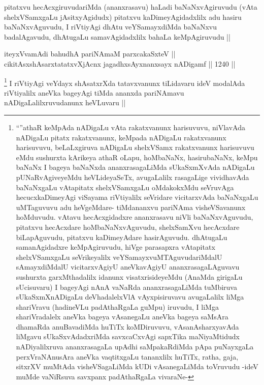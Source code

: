 \begin{artha}
pitatxvu hecAcxgiruvudariMda (ananxrasavu) haLadi baNaNxvAgiruvudu (vAta shelxVSamxgaLu jAsitxyAgidudx) pitatxvu kaDimeyAgidadxlilx adu hasiru baNaNxvAguvudu, I riVtiyAgi dhAtu veYSamayxdiMda baNaNxvu badalAgavudu, dhAtugaLu samavAgidadxlilx bahaLa keMpAgiruvudu ||
\end{artha}

\begin{shl}
iteyxVvamAdi bahudhA pariNAmaM parxcakaSxteV || \\
cikitAsxshAsarxtatatxvXjAcnx jagadhxsAyxnanxsayx nADigamf ||  1240 ||  
\end{shl}

\begin{artha}
\footnote{``\stext''athaR keMpAda nADigaLu vAta rakatxvanunx harisuvuvu, niVlavAda nADigaLu pitatx rakatxvanunx, keMpada nADigaLu rakatxvanunx harisuvuvu, beLaLxgiruva nADigaLu shelxVSamx rakatxvanunx harisuvuvu eMdu sushurxta kArikeya athaR oLapu, hoMbaNaNx, hasirubaNaNx, keMpu baNaNx I bageya baNaNxda ananxrasagaLiMda sUkaSxmXvAda nADigaLu pUNaRvAgiveyeMdu heVLideyaSeTx, avugaLalilx rasagaLige vividhavAda baNaNxgaLu vAtapitatx shelxVSamxgaLu oMdakokxMdu seVruvAga hecucxkaDimeyAgi viSayama riVtiyalilx seVridare vicitarxvAda baNaNxgaLu uMTaguvuvu adu heVgeMdare- tiMdananxvu pariNAma visheVSavanunx hoMduvudu. vAtavu hecAcxgidadxre ananxrasavu niVli baNaNxvAguvudu, pitatxvu hecAcxdare hoMbaNaNxvAguvudu, shelxSamXvu hecAcxdare biLapAguvudu, pitatxvu kaDimeyAdare hasirAguvudu. dhAtugaLu samanAgidadxre keMpAgiruvudu, hiVge parasapxra vAtapitatx shelxVSamxgaLu seVrikeyalilx veYSamayxvuMTAguvudariMdalU sAmayxdiMdalU vicitarxvAgiyU aneVkavAgiyU ananxrasagaLAguvavu sushurxta garxMthadalilx idanunx visatxrisideyeMdu (AnaMda girigaLu sUcisuvaru) I bageyAgi nAnA vaNaRda ananxrasagaLiMda tuMbiruva sUkaSxmXnADigaLu deVhadalelxVlA vAyxpisiruvavu avugaLalilx liMga shariVravu (hadineVLu padAthaRgaLa guMpu) iruvudu, I liMga shariVradalelx aneVka bageya vAsanegaLu aneVka bageya saMsAra dhamaRda anuBavadiMda huTiTx koMDiruvuvu, vAsanAsharxyavAda liMgavu sUkaSxvAdadxriMda savxcaCxvAgi sapxTika maNiyaMtidudx nADiyalilxruva ananxrasagaLa upAdhi saMpakaRdiMda pApa puNayxgaLa perxVraNAnusAra aneVka vaqtitxgaLu tananxlilx huTiTx, ratha, gaja, sitxrXV muMtAda visheVSagaLiMda kUDi vAsanegaLiMda toVruvudu -ideV muMde vaNiRsuva savxpanx padAthaRgaLa vivaraNe-}
I riVtiyAgi veYdayx shAsatxrXda tatavxvanunx tiLidavaru ideV modalAda riVtiyalilx aneVka bageyAgi tiMda ananxda pariNAmavu nADigaLalilxruvudanunx heVLuvaru ||
\end{artha}

